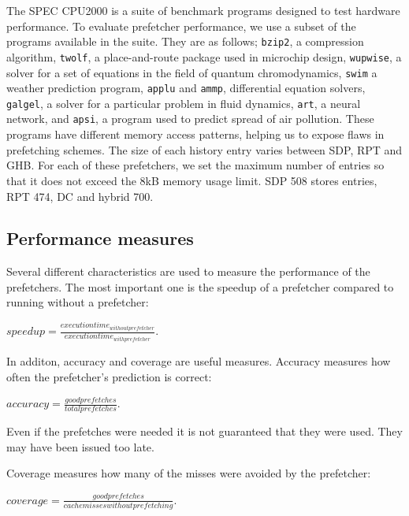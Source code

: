 The SPEC CPU2000\cite{bib:cpu2000} is a suite of benchmark programs
designed to test hardware performance.  To evaluate prefetcher
performance, we use a subset of the programs available in the suite.
They are as follows; \texttt{bzip2}, a compression algorithm,
\texttt{twolf}, a place-and-route package used in microchip design,
\texttt{wupwise}, a solver for a set of equations in the field of
quantum chromodynamics, \texttt{swim} a weather prediction program,
\texttt{applu} and \texttt{ammp}, differential equation solvers,
\texttt{galgel}, a solver for a particular problem in fluid dynamics,
\texttt{art}, a neural network, and \texttt{apsi}, a program used to
predict spread of air pollution.  These programs have different memory
access patterns, helping us to expose flaws in prefetching schemes.
The size of each history entry varies between SDP, RPT and GHB. For
each of these prefetchers, we set the maximum number of entries so
that it does not exceed the $8$kB memory usage limit. SDP 508 stores
entries, RPT 474, DC and hybrid 700.

\subsection{Performance measures}
Several different characteristics are used to measure the performance
of the prefetchers. The most important one is the speedup of a
prefetcher compared to running without a prefetcher:

$speedup = \frac{execution time_{without prefetcher}}{execution time_{with prefetcher}}$.

In additon, accuracy and coverage are useful measures. Accuracy measures
how often the prefetcher's prediction is correct:

$accuracy = \frac{good prefetches}{total prefetches}$.

Even if the prefetches were needed it is not guaranteed that they
were used. They may have been issued too late.

Coverage measures how many of the misses were avoided by the
prefetcher:

$coverage = \frac{good prefetches}{cache misses without prefetching}$.

\cite{bib:doc}
